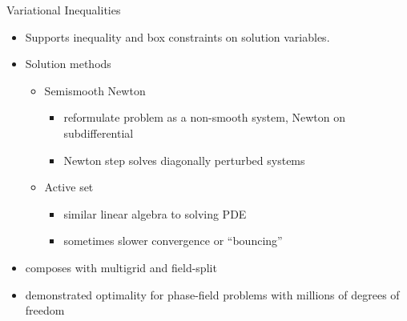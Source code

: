 \begin{frame}{Variational Inequalities}
  \begin{itemize}
  \item Supports inequality and box constraints on solution variables.
  \item Solution methods
    \begin{itemize}
    \item Semismooth Newton
      \begin{itemize}
      \item reformulate problem as a non-smooth system, Newton on subdifferential
      \item Newton step solves diagonally perturbed systems
      \end{itemize}
    \item Active set
      \begin{itemize}
      \item similar linear algebra to solving PDE
      \item sometimes slower convergence or ``bouncing''
      \end{itemize}
    \end{itemize}
  \item composes with multigrid and field-split
  \item demonstrated optimality for phase-field problems with millions of degrees of freedom
  \end{itemize}
\end{frame}
